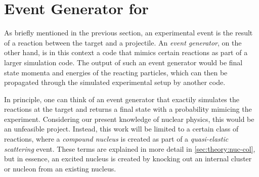 

\section{Event Generator for \rtb{}}
As briefly mentioned in the previous section, an experimental event is the result of a reaction between the target and a projectile.
An \emph{event generator}, on the other hand, is in this context a code that mimics certain reactions as part of a larger simulation code. The output of such an event generator would be final state momenta and energies of the reacting particles, which can then be propagated through the simulated experimental setup by another code. 

In principle, one can think of an event generator that exactily simulates the reactions at the target and returns a final state with a probability mimicing the experiment. Considering our present knowledge of nuclear physics, this would be an unfeasible project. Instead, this work will be limited to a certain class of reactions, where a \emph{compound nucleus} is created as part of a \emph{quasi-elastic scattering} event. These terms are explained in more detail in \autoref{sec:theory:nuc-col}, but in essence, an excited nucleus is created by knocking out an internal cluster or nucleon from an existing nucleus.




